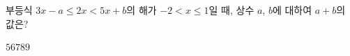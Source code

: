 부등식 $3x-a\le 2x<5x+b$의 해가 $-2<x\le 1$일 때, 상수 $a$, $b$에 대하여 $a+b$의 값은?
\begin{choices32}{$5$}{$6$}{$7$}{$8$}{$9$}\end{choices32}
